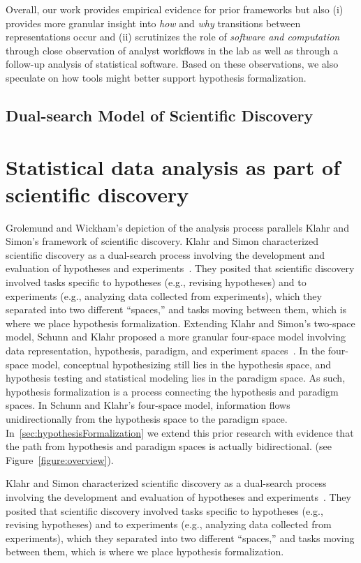 Overall, our work provides empirical evidence for prior frameworks but also (i)
provides more granular insight into \textit{how} and \textit{why} transitions between
representations occur and (ii) scrutinizes the role of
\textit{software and computation} through close observation of analyst workflows
in the lab as well as through a follow-up analysis of statistical software. Based on
these observations, we also speculate on how tools might better support hypothesis
formalization.


\subsection{Dual-search Model of Scientific Discovery}

\section{Statistical data analysis as part of scientific discovery}
Grolemund and Wickham's depiction of the analysis process parallels Klahr and
Simon's framework of scientific discovery. Klahr and Simon characterized
scientific discovery as a dual-search process involving the development and
evaluation of hypotheses and experiments~\cite{klahr1988dual}. They posited that
scientific discovery involved tasks specific to hypotheses (e.g., revising
hypotheses) and to experiments (e.g., analyzing data collected from
experiments), which they separated into two different ``spaces,'' and tasks
moving between them, which is where we place hypothesis formalization. Extending
Klahr and Simon's two-space model, Schunn and Klahr proposed a more granular
four-space model involving data representation, hypothesis, paradigm, and
experiment spaces~\cite{schunn1995FourSpace,schunn1996BeyondTwoSpace}. In the
four-space model, conceptual hypothesizing still lies in the hypothesis space,
and hypothesis testing and statistical modeling lies in the paradigm space. As
such, hypothesis formalization is a process connecting the hypothesis and
paradigm spaces. In Schunn and Klahr's four-space model, information flows
unidirectionally from the hypothesis space to the paradigm space.
In~\autoref{sec:hypothesisFormalization} we extend this prior research with
evidence that the path from hypothesis and paradigm spaces is actually
bidirectional. (see Figure~\ref{figure:overview}).

Klahr and Simon characterized scientific discovery as a dual-search process
involving the development and evaluation of hypotheses and
experiments~\cite{klahr1988dual}. They posited that scientific
discovery involved tasks specific to hypotheses (e.g., revising hypotheses) and
to experiments (e.g., analyzing data collected from experiments), which they
separated into two different ``spaces,'' and tasks moving between them, which is
where we place hypothesis formalization.


